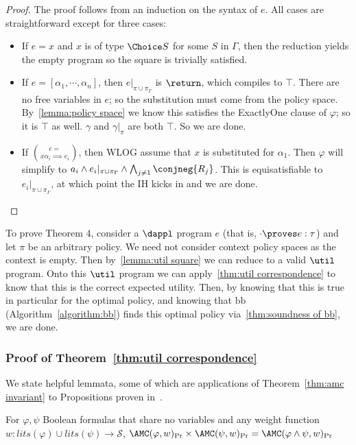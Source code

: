 \begin{proof}
  The proof follows from an induction on the syntax of $e$. All cases are straightforward except for three cases:
  \begin{itemize}
    \item If $e = x$ and $x$ is of type $\Choice S$ for some $S$ in $\Gamma$, then 
    the reduction yields the empty program so the square is trivially satisfied.
    \item If $e = [\alpha_1, \cdots, \alpha_n]$, then $e|_{\pi \cup \pi_{\Gamma}}$ is 
    $\return \tt$, which compiles to $\top$.
    There are no free variables in $e$; so the substitution must come from the 
    policy space. By~\cref{lemma:policy space} we know this satisfies the ExactlyOne
    clause of $\varphi$; so it is $\top$ as well. $\gamma$ and $\gamma|_{\pi}$ are both
    $\top$. So we are done.
    \item If $e = \choose x {\alpha_i \implies e_i}$, then WLOG assume that $x$ is substituted for $\alpha_1$. Then $\varphi$ will simplify to $a_i \land e_i|_{\pi \cup \pi_{\Gamma}} \land \bigwedge_{j \neq 1} \conjneg{R_j}$. This is equisatisfiable to $e_i|_{\pi \cup \pi_{\Gamma}} $, at which point the IH kicks in and we are done.
  \end{itemize}
\end{proof}

To prove Theorem 4, consider a $\dappl$ program $e$ (that is, $\cdot \proves e : \tau$) and let $\pi$ be an arbitrary policy. We need not consider context policy spaces as the context is empty. 
Then by~\cref{lemma:util square} we can reduce to a valid $\util$ program. 
Onto this $\util$ program we can apply~\cref{thm:util correspondence}
to know that this is the correct expected utility. Then, by knowing that this is true in 
particular for the optimal policy, and knowing that $\text{bb}$ (Algorithm~\ref{algorithm:bb}) finds this optimal policy
via~\cref{thm:soundness of bb}, we are done.

\subsubsection{Proof of Theorem~\ref{thm:util correspondence}}

We state helpful lemmata, some of which are 
applications of Theorem~\ref{thm:amc invariant} to Propositions
proven in~\citet{holtzen2020scaling}.

\begin{lemma}
\label{lemma:ind conj prob}
  For $\varphi, \psi$ Boolean formulas that share no variables
  and any weight function $w : lits(\varphi) \cup lits(\psi) \to \mathcal S$,
  $\AMC(\varphi,w)_{\Pr}\times\AMC(\psi,w)_{\Pr} = \AMC(\varphi \land \psi,w)_{\Pr}$
\end{lemma}

